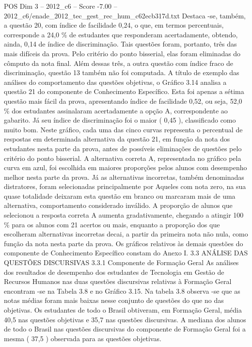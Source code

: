 \begin{textsample}{POS Dim 3 – 2012\_c6 – Score -7.00 – 2012\_c6/enade\_2012\_tec\_gest\_rec\_hum\_c62ecb317d.txt}
Destaca -se, também, a questão 20, com índice de facilidade 0,24, o que, em termos percentuais, corresponde a 24,0 \% de estudantes que responderam acertadamente, obtendo, ainda, 0,14 de índice de discriminação.
Tais questões foram, portanto, três das mais difíceis da prova.
Pelo critério do ponto bisserial, elas foram eliminadas do cômputo da nota final.
Além dessas três, a outra questão com índice fraco de discriminação, questão 13 também não foi computada.
A título de exemplo das análises do comportamento das questões objetivas, o Gráfico 3.14 analisa a questão 21 do componente de Conhecimento Específico.
Esta foi apenas a sétima questão mais fácil da prova, apresentando índice de facilidade 0,52, ou seja, 52,0 \% dos estudantes assinalaram acertadamente a opção A, correspondente ao gabarito.
Já seu índice de discriminação foi o maior ( 0,45 ), classificado como muito bom.
Neste gráfico, cada uma das cinco curvas representa o percentual de respostas em determinada alternativa da questão 21, em função da nota dos estudantes nesta parte da prova, antes de possíveis eliminações de questões pelo critério do ponto bisserial.
A alternativa correta A, representada no gráfico pela curva em azul, foi escolhida em maiores proporções pelos alunos com desempenho melhor nesta parte da prova.
Já as alternativas incorretas, também denominadas distratores, foram selecionadas principalmente por Aqueles com nota zero, na sua quase totalidade deixaram esta questão em branco ou marcaram mais de uma alternativa, comportamento considerado inválido.
A proporção de alunos que selecionou a resposta correta A aumenta gradativamente, chegando a atingir 100 \% para os alunos com 21 acertos ou mais, enquanto a proporção dos que escolheram alternativas incorretas decai, a partir da primeira nota não nula, como função da nota nesta parte da prova.
Os gráficos relativos às demais questões do componente de Conhecimento Específico constam do Anexo I. 3.3 ANÁLISE DAS QUESTÕES DISCURSIVAS 3.3.1 Componente de Formação Geral As análises dos resultados de desempenho dos estudantes de Tecnologia em Gestão de Recursos Humanos nas duas questões discursivas relativas à Formação Geral encontram -se na Tabela 3.8 e no Gráfico 3.15.
Na tabela 3.8 observa -se que as notas médias foram mais baixas nesse conjunto de questões do que no das objetivas.
Os estudantes de todo o Brasil obtiveram, em Formação Geral, média 40,5 nas questões objetivas e 35,7 nas questões discursivas.
A mediana dos alunos de todo o Brasil nas questões discursivas do componente de Formação Geral foi a mesma ( 37,5 ) observada para as questões objetivas.

\end{textsample}
